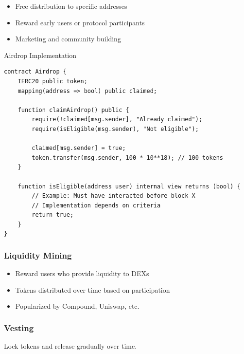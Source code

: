 \documentclass[11pt,a4paper]{article}
\begin{document}
\begin{itemize}
  \item Free distribution to specific addresses
  \item Reward early users or protocol participants
  \item Marketing and community building
\end{itemize}

\begin{examplebox}{Airdrop Implementation}
\begin{lstlisting}[language=Solidity]
contract Airdrop {
    IERC20 public token;
    mapping(address => bool) public claimed;

    function claimAirdrop() public {
        require(!claimed[msg.sender], "Already claimed");
        require(isEligible(msg.sender), "Not eligible");

        claimed[msg.sender] = true;
        token.transfer(msg.sender, 100 * 10**18); // 100 tokens
    }

    function isEligible(address user) internal view returns (bool) {
        // Example: Must have interacted before block X
        // Implementation depends on criteria
        return true;
    }
}
\end{lstlisting}
\end{examplebox}

\subsubsection{Liquidity Mining}

\begin{itemize}
  \item Reward users who provide liquidity to DEXs
  \item Tokens distributed over time based on participation
  \item Popularized by Compound, Uniswap, etc.
\end{itemize}

\subsubsection{Vesting}

Lock tokens and release gradually over time.
\end{document}
